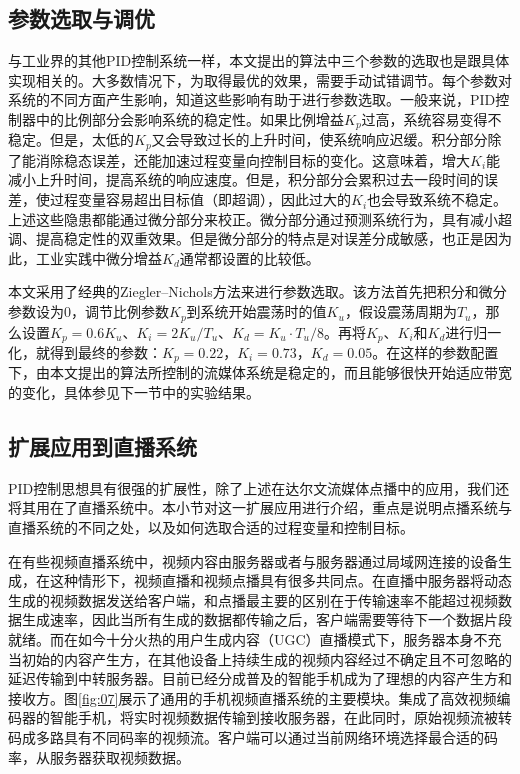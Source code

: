 \subsection{参数选取与调优}

与工业界的其他PID控制系统一样，本文提出的算法中三个参数的选取也是跟具体实现相关的。大多数情况下，为取得最优的效果，需要手动试错调节。每个参数对系统的不同方面产生影响，知道这些影响有助于进行参数选取。一般来说，PID控制器中的比例部分会影响系统的稳定性。如果比例增益$K_p$过高，系统容易变得不稳定。但是，太低的$K_p$又会导致过长的上升时间，使系统响应迟缓。积分部分除了能消除稳态误差，还能加速过程变量向控制目标的变化。这意味着，增大$K_i$能减小上升时间，提高系统的响应速度。但是，积分部分会累积过去一段时间的误差，使过程变量容易超出目标值（即超调），因此过大的$K_i$也会导致系统不稳定。上述这些隐患都能通过微分部分来校正。微分部分通过预测系统行为，具有减小超调、提高稳定性的双重效果。但是微分部分的特点是对误差分成敏感，也正是因为此，工业实践中微分增益$K_d$通常都设置的比较低。

本文采用了经典的Ziegler--Nichols方法\supercite{Ziegler1942}来进行参数选取。该方法首先把积分和微分参数设为0，调节比例参数$K_p$到系统开始震荡时的值$K_u$，假设震荡周期为$T_u$，那么设置$K_p = 0.6K_u$、$K_i = 2K_u/T_u$、$K_d = K_u \cdot T_u/8$。再将$K_p$、$K_i$和$K_d$进行归一化，就得到最终的参数：$K_p = 0.22$，$K_i = 0.73$，$K_d = 0.05$。在这样的参数配置下，由本文提出的算法所控制的流媒体系统是稳定的，而且能够很快开始适应带宽的变化，具体参见下一节中的实验结果。

\subsection{扩展应用到直播系统}

PID控制思想具有很强的扩展性，除了上述在达尔文流媒体点播中的应用，我们还将其用在了直播系统中。本小节对这一扩展应用进行介绍，重点是说明点播系统与直播系统的不同之处，以及如何选取合适的过程变量和控制目标。

在有些视频直播系统中，视频内容由服务器或者与服务器通过局域网连接的设备生成，在这种情形下，视频直播和视频点播具有很多共同点。在直播中服务器将动态生成的视频数据发送给客户端，和点播最主要的区别在于传输速率不能超过视频数据生成速率，因此当所有生成的数据都传输之后，客户端需要等待下一个数据片段就绪\supercite{Thang2014}。而在如今十分火热的用户生成内容（UGC）直播模式下，服务器本身不充当初始的内容产生方，在其他设备上持续生成的视频内容经过不确定且不可忽略的延迟传输到中转服务器。目前已经分成普及的智能手机成为了理想的内容产生方和接收方。图\ref{fig:07}展示了通用的手机视频直播系统的主要模块。集成了高效视频编码器的智能手机，将实时视频数据传输到接收服务器，在此同时，原始视频流被转码成多路具有不同码率的视频流。客户端可以通过当前网络环境选择最合适的码率，从服务器获取视频数据。

